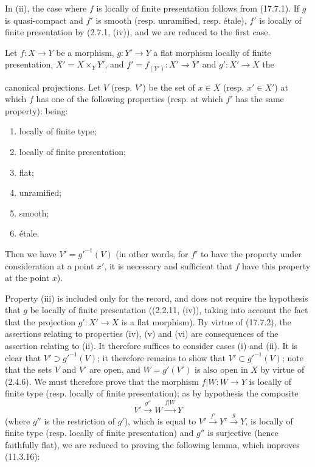 In (ii), the case where $f$ is locally of finite presentation follows from (17.7.1). If $g$ is quasi-compact and $f'$ is smooth (resp. unramified, resp. étale), $f'$ is locally of finite presentation by (2.7.1, (iv)), and we are reduced to the first case.

\begin{proposition}[17.7.4]
\label{IV.17.7.4}
Let $f:X\to Y$ be a morphism, $g:Y'\to Y$ a flat morphism locally of finite presentation, $X'=X\times_Y Y'$, and $f'=f_{(Y')}:X'\to Y'$ and $g':X'\to X$ the


canonical projections. Let $V$ (resp. $V'$) be the set of $x\in X$ (resp. $x'\in X'$) at which $f$ has one of the following properties (resp. at which $f'$ has the same property): being:
\begin{enumerate}
  \item[(i)] locally of finite type;
  \item[(ii)] locally of finite presentation;
  \item[(iii)] flat;
  \item[(iv)] unramified;
  \item[(v)] smooth;
  \item[(vi)] étale.
\end{enumerate}
Then we have $V'=g'^{-1}(V)$ (in other words, for $f'$ to have the property under consideration at a point $x'$, it is necessary and sufficient that $f$ have this property at the point $x$).
\end{proposition}

Property (iii) is included only for the record, and does not require the hypothesis that $g$ be locally of finite presentation ((2.2.11, (iv)), taking into account the fact that the projection $g':X'\to X$ is a flat morphism). By virtue of (17.7.2), the assertions relating to properties (iv), (v) and (vi) are consequences of the assertion relating to (ii). It therefore suffices to consider cases (i) and (ii). It is clear that $V'\supset g'^{-1}(V)$; it therefore remains to show that $V'\subset g'^{-1}(V)$; note that the sets $V$ and $V'$ are open, and $W=g'(V')$ is also open in $X$ by virtue of (2.4.6). We must therefore prove that the morphism $f|W:W\to Y$ is locally of finite type (resp. locally of finite presentation); as by hypothesis the composite
\[
V'\xrightarrow{g''}W\xrightarrow{f|W}Y
\]
(where $g''$ is the restriction of $g'$), which is equal to $V'\xrightarrow{f'}Y'\xrightarrow{g}Y$, is locally of finite type (resp. locally of finite presentation) and $g''$ is surjective (hence faithfully flat), we are reduced to proving the following lemma, which improves (11.3.16):

